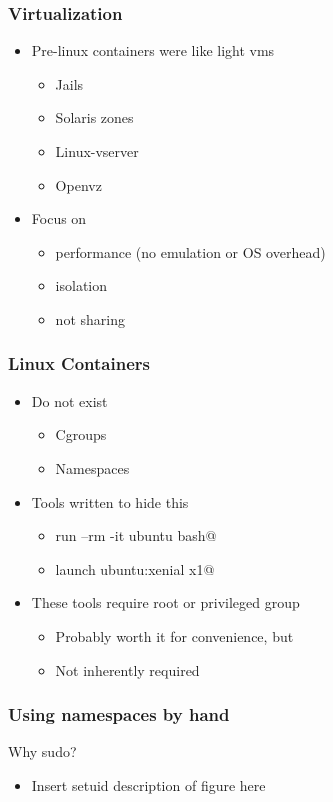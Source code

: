 \documentclass{beamer}
\begin{document}
\begin{frame}[fragile]
\frametitle{Virtualization}
	\begin{itemize}
	\item Pre-linux containers were like light vms
		\begin{itemize}
		\item Jails
		\item Solaris zones
		\item Linux-vserver
		\item Openvz
		\end{itemize}
	\item Focus on 
		\begin{itemize}
		\item performance (no emulation or OS overhead)
		\item isolation
		\item not sharing
		\end{itemize}
	\end{itemize}
\end{frame}

\begin{frame}[fragile]
\frametitle{Linux Containers}
	\begin{itemize}
	\item Do not exist
		\begin{itemize}
		\item Cgroups
		\item Namespaces
		\end{itemize}
	\item Tools written to hide this
		\begin{itemize}
		\item \verb@docker run --rm -it ubuntu bash@
		\item \verb@lxc launch ubuntu:xenial x1@
		\end{itemize}
	\item These tools require root or privileged group
	\begin{itemize}

		\item Probably worth it for convenience, but
		\item Not inherently required
		\end{itemize}
	\end{itemize}
\end{frame}

\begin{frame}
\frametitle{Using namespaces by hand}
\begin{center}
\begin{figure}

\end{figure}
\pause
\vspace{1in}
\item Why sudo?
\end{center}

	\begin{itemize}
	\item Insert setuid description of figure here
	\end{itemize}
\end{frame}
\end{document}
